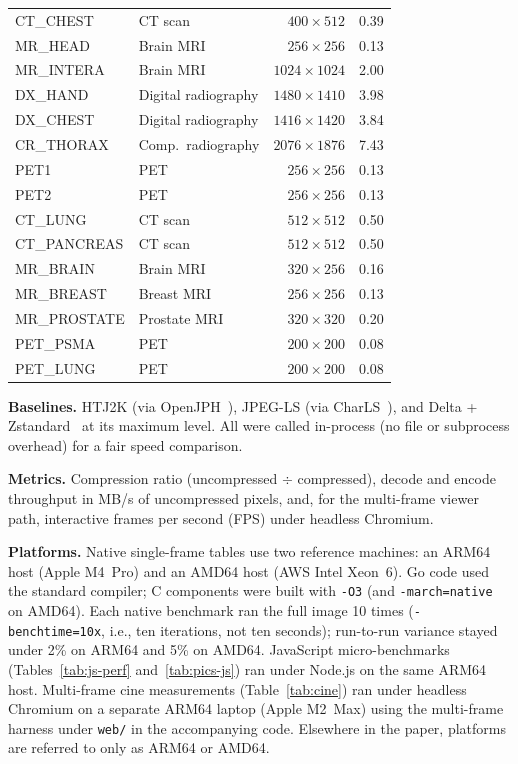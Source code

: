 \documentclass[journal]{IEEEtran}
\begin{document}
\begin{table}[htbp]
\begin{tabular}{llrr}
CT\_CHEST    & CT scan             & $400{\times}512$   & 0.39 \\
MR\_HEAD     & Brain MRI           & $256{\times}256$   & 0.13 \\
MR\_INTERA   & Brain MRI           & $1024{\times}1024$ & 2.00 \\
DX\_HAND     & Digital radiography & $1480{\times}1410$ & 3.98 \\
DX\_CHEST    & Digital radiography & $1416{\times}1420$ & 3.84 \\
CR\_THORAX   & Comp.\ radiography  & $2076{\times}1876$ & 7.43 \\
PET1         & PET                 & $256{\times}256$   & 0.13 \\
PET2         & PET                 & $256{\times}256$   & 0.13 \\
CT\_LUNG     & CT scan             & $512{\times}512$   & 0.50 \\
CT\_PANCREAS & CT scan             & $512{\times}512$   & 0.50 \\
MR\_BRAIN    & Brain MRI           & $320{\times}256$   & 0.16 \\
MR\_BREAST   & Breast MRI          & $256{\times}256$   & 0.13 \\
MR\_PROSTATE & Prostate MRI        & $320{\times}320$   & 0.20 \\
PET\_PSMA    & PET                 & $200{\times}200$   & 0.08 \\
PET\_LUNG    & PET                 & $200{\times}200$   & 0.08 \\
\bottomrule
\end{tabular}
\end{table}

\textbf{Baselines.} HTJ2K (via OpenJPH~\cite{openjph}), JPEG-LS (via
CharLS~\cite{charls}), and Delta + Zstandard~\cite{rfc8878} at its maximum
level. All were called in-process (no file or subprocess overhead) for a fair
speed comparison.

\textbf{Metrics.} Compression ratio (uncompressed $\div$ compressed), decode
and encode throughput in MB/s of uncompressed pixels, and, for the multi-frame
viewer path, interactive frames per second (FPS) under headless Chromium.

\textbf{Platforms.}
\label{subsec:bench-procedure}
Native single-frame tables use two reference machines: an ARM64 host (Apple
M4~Pro) and an AMD64 host (AWS Intel Xeon~6). Go code used the standard
compiler; C components were built with \texttt{-O3} (and \texttt{-march=native}
on AMD64). Each native benchmark ran the full image 10 times (\texttt{-benchtime=10x},
i.e., ten iterations, not ten seconds); run-to-run variance stayed under 2\% on
ARM64 and 5\% on AMD64. JavaScript micro-benchmarks (Tables~\ref{tab:js-perf}
and~\ref{tab:pics-js}) ran under Node.js on the same ARM64 host. Multi-frame
cine measurements (Table~\ref{tab:cine}) ran under headless Chromium on a
separate ARM64 laptop (Apple M2~Max) using the multi-frame harness under
\texttt{web/} in the accompanying code. Elsewhere in the paper, platforms are
referred to only as ARM64 or AMD64.
\end{document}
